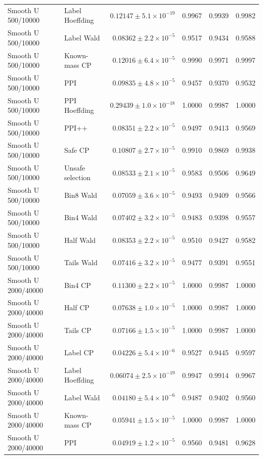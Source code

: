 \begin{longtable}{llrrrr}
Smooth U 500/10000 & Label Hoeffding & $0.12147\pm 5.1\times 10^{-19}$ & 0.9967 & 0.9939 & 0.9982 \\
Smooth U 500/10000 & Label Wald & $0.08362\pm 2.2\times 10^{-5}$ & 0.9517 & 0.9434 & 0.9588 \\
Smooth U 500/10000 & Known-mass CP & $0.12016\pm 6.4\times 10^{-5}$ & 0.9990 & 0.9971 & 0.9997 \\
Smooth U 500/10000 & PPI & $0.09835\pm 4.8\times 10^{-5}$ & 0.9457 & 0.9370 & 0.9532 \\
Smooth U 500/10000 & PPI Hoeffding & $0.29439\pm 1.0\times 10^{-18}$ & 1.0000 & 0.9987 & 1.0000 \\
Smooth U 500/10000 & PPI++ & $0.08351\pm 2.2\times 10^{-5}$ & 0.9497 & 0.9413 & 0.9569 \\
Smooth U 500/10000 & Safe CP & $0.10807\pm 2.7\times 10^{-5}$ & 0.9910 & 0.9869 & 0.9938 \\
Smooth U 500/10000 & Unsafe selection & $0.08533\pm 2.1\times 10^{-5}$ & 0.9583 & 0.9506 & 0.9649 \\
Smooth U 500/10000 & Bin8 Wald & $0.07059\pm 3.6\times 10^{-5}$ & 0.9493 & 0.9409 & 0.9566 \\
Smooth U 500/10000 & Bin4 Wald & $0.07402\pm 3.2\times 10^{-5}$ & 0.9483 & 0.9398 & 0.9557 \\
Smooth U 500/10000 & Half Wald & $0.08353\pm 2.2\times 10^{-5}$ & 0.9510 & 0.9427 & 0.9582 \\
Smooth U 500/10000 & Tails Wald & $0.07416\pm 3.2\times 10^{-5}$ & 0.9477 & 0.9391 & 0.9551 \\
Smooth U 2000/40000 & Bin4 CP & $0.11300\pm 2.2\times 10^{-5}$ & 1.0000 & 0.9987 & 1.0000 \\
Smooth U 2000/40000 & Half CP & $0.07638\pm 1.0\times 10^{-5}$ & 1.0000 & 0.9987 & 1.0000 \\
Smooth U 2000/40000 & Tails CP & $0.07166\pm 1.5\times 10^{-5}$ & 1.0000 & 0.9987 & 1.0000 \\
Smooth U 2000/40000 & Label CP & $0.04226\pm 5.4\times 10^{-6}$ & 0.9527 & 0.9445 & 0.9597 \\
Smooth U 2000/40000 & Label Hoeffding & $0.06074\pm 2.5\times 10^{-19}$ & 0.9947 & 0.9914 & 0.9967 \\
Smooth U 2000/40000 & Label Wald & $0.04180\pm 5.4\times 10^{-6}$ & 0.9487 & 0.9402 & 0.9560 \\
Smooth U 2000/40000 & Known-mass CP & $0.05941\pm 1.5\times 10^{-5}$ & 1.0000 & 0.9987 & 1.0000 \\
Smooth U 2000/40000 & PPI & $0.04919\pm 1.2\times 10^{-5}$ & 0.9560 & 0.9481 & 0.9628 \\

\end{longtable}
